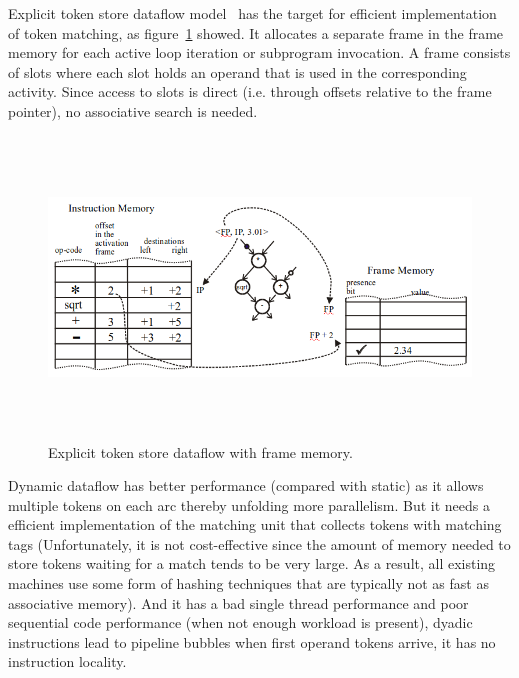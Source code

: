 \documentclass[UTF8,12pt,a4paper]{article}
\begin{document}
Explicit token store dataflow model~\cite{DBLP:conf/isca/PapadopoulosC90}
has the target for efficient implementation of token matching,
as figure~\ref{fig:explicit_token_store_dataflow} showed.
It allocates a separate frame in the frame memory for each active loop iteration or subprogram invocation.
A frame consists of slots where each slot holds an operand that is used in the corresponding activity. 
Since access to slots is direct (i.e. through offsets relative to the frame pointer), no associative search is needed.

\begin{figure}[htb]
  \begin{small}
    \begin{center}
      \includegraphics[width=\textwidth,height=8cm]{figures/explicit_token_store_dataflow.png}
    \end{center}
    \caption{Explicit token store dataflow with frame memory.}
    \label{fig:explicit_token_store_dataflow}
  \end{small}
\end{figure}

Dynamic dataflow has better performance (compared with static)
as it allows multiple tokens on each arc thereby unfolding more parallelism. 
But it needs a efficient implementation of the matching unit that collects tokens with matching tags
(Unfortunately, it is not cost-effective since the amount of memory needed to store tokens waiting for a match tends to be very large. 
As a result, all existing machines use some form of hashing techniques that are typically not as fast as associative memory).
And it has a bad single thread performance and poor sequential code performance (when not enough workload is present),
dyadic instructions lead to pipeline bubbles when first operand tokens arrive,
it has no instruction locality.
\end{document}
